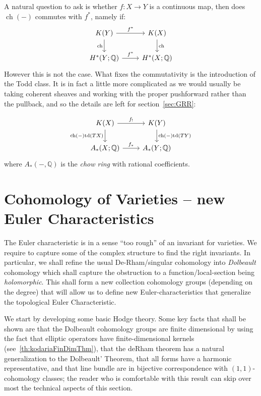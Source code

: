 \documentclass{ut-thesis}
\newcommand{\Q}{{\mathbb{Q}}}
\newcommand{\ch}{{\operatorname{ch}}}
\newcommand{\td}{{\operatorname{td}}}
\renewcommand{\ch}{{\operatorname{ch}}}
\begin{document}
A natural question to ask is whether $f: X \to Y$ is a continuous map, then does $\ch(-)$ commutes with $f^*$, namely
if:
\[
\begin{tikzcd}
K(Y) \arrow[r, "f^*"] \arrow[d, "\ch"'] & K(X) \arrow[d, "\ch"] \\
H^*(Y; \Q) \arrow[r, "f^*"]             & H^*(X; \Q)
\end{tikzcd}
\]
However this is not the case. What fixes the commutativity is the introduction of the Todd class. It is in
fact a little more complicated as we would usually be taking coherent sheaves and working with the
proper pushforward rather than the pullback, and so the details are left for section~\ref{sec:GRR}:

\[
\begin{tikzcd}
K(X) \arrow[r, "f_!"] \arrow[d, "\ch(-)\td(TX)"'] & K(Y) \arrow[d, "\ch(-)\td(TY)"] \\
A_*(X; \Q) \arrow[r, "f_*"]             & A_*(Y; \Q)
\end{tikzcd}
\]
where $A_*(-, \Q)$ is the \emph{chow ring} with rational coefficients.

\chapter{Cohomology of Varieties -- new Euler Characteristics}\label{cha:cohomVarieties}

The Euler characteristic is in a sense ``too rough'' of an invariant for varieties. We require to capture some
of the complex structure to find the right invariants. In particular, we shall refine the usual
De-Rham/singular cohomology into \emph{Dolbeault} cohomology which shall capture the obstruction to
a function/local-section being \emph{holomorphic}. This shall form a new collection cohomology groups (depending on
the degree) that will allow us to define new Euler-characteristics that generalize the topological Euler
Characteristic.

We start by developing some basic Hodge theory. Some key facts that shall be shown are that the Dolbeault
cohomology groups are finite dimensional by using the fact that elliptic operators have finite-dimensional
kernels (see~\cref{th:kodariaFinDimThm}), that the deRham theorem has a natural generalization to the
Dolbeault' Theorem, that all forms have a harmonic representative, and that line bundle are in bijective
correspondence with $(1,1)$-cohomology classes; the reader who is comfortable with this result can skip over
most the technical aspects of this section.
\end{document}
